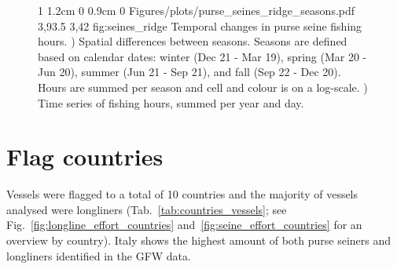 \begin{figure}[ht]
	{1\linewidth}
	{1.2cm 0 0.9cm 0}                       %
	{Figures/plots/purse_seines_ridge_seasons.pdf} %
	{3,93.5}                                  %
	{3,42}                                  %
	{fig:seines_ridge}
	{%
		Temporal changes in purse seine fishing hours. ) Spatial differences between seasons. Seasons are defined based on calendar dates:
		winter (Dec 21 - Mar 19), spring (Mar 20 - Jun 20), summer (Jun 21 - Sep 21), and fall (Sep 22 - Dec 20).
		Hours are summed per season and cell and colour is on a log-scale. ) Time series of fishing hours, summed per year
		and day.}
\end{figure}

\FloatBarrier
\section{Flag countries}

Vessels were flagged to a total of 10 countries and the majority of vessels analysed were
longliners (Tab.~\ref{tab:countries_vessels}; see Fig.~\ref{fig:longline_effort_countries}
and~\ref{fig:seine_effort_countries} for an overview by country). Italy shows the highest amount of
both purse seiners and longliners identified in the GFW data.

\medskip

